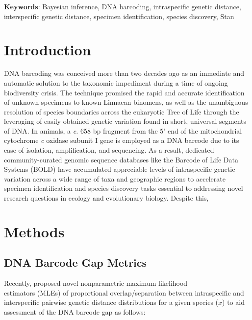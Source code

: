 \documentclass[12pt]{article}
\begin{document}
\textbf{Keywords}: Bayesian inference, DNA barcoding, intraspecific genetic distance, \\ interspecific genetic distance, specimen identification, species discovery, Stan 

\vspace{2mm}

\section{Introduction}

DNA barcoding \citep{hebert2003biological, hebert2003barcoding} was conceived more than two decades ago as an immediate and automatic solution to the taxonomic impediment during a time of ongoing biodiversity crisis. The technique promised the rapid and accurate identification of unknown specimens to known Linnaean binomens, as well as the unambiguous resolution of species boundaries across the eukaryotic Tree of Life through the leveraging of easily obtained genetic variation found in short, universal segments of DNA. In animals, a \textit{c.} 658 bp fragment from the 5' end of the mitochondrial cytochrome \textit{c} oxidase subunit I gene is employed as a DNA barcode due to its ease of isolation, amplification, and sequencing. As a result, dedicated community-curated genomic sequence databases like the Barcode of Life Data Systems (BOLD) \citep{ratnasingham2007bold} have accumulated appreciable levels of intraspecific genetic variation across a wide range of taxa and geographic regions to accelerate specimen identification and species discovery tasks essential to addressing novel research questions in ecology and evolutionary biology. Despite this, 


\section{Methods}

\subsection{DNA Barcode Gap Metrics}

Recently, \citet{phillips2024measure} proposed novel nonparametric maximum likelihood \\ estimators (MLEs) of proportional overlap/separation between intraspecific and interspecific pairwise genetic distance distributions for a given species ($x$) to aid assessment of the DNA barcode gap as follows:
\end{document}
